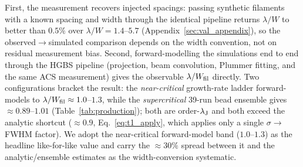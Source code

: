 \documentclass[usenatbib,twoside,twocolumn]{mnras}
\begin{document}
First, the measurement recovers injected spacings: passing synthetic filaments with a known spacing and width through the identical pipeline returns $\lambda/W$ to better than $0.5\%$ over $\lambda/W=1.4$--$5.7$ (Appendix~\ref{sec:val_appendix}), so the observed$\to$simulated comparison depends on the width convention, not on residual measurement bias. Second, forward-modelling the simulations end to end through the HGBS pipeline (projection, beam convolution, Plummer fitting, and the same ACS measurement) gives the observable $\lambda/W_{\rm fil}$ directly. Two configurations bracket the result: the \emph{near-critical} growth-rate ladder forward-models to $\lambda/W_{\rm fil}\approx1.0$--$1.3$, while the \emph{supercritical} 39-run bead ensemble gives $\approx0.89$--$1.01$ (Table~\ref{tab:production}); both are order-$\lambda_{\rm J}$ and both exceed the analytic shortcut ($\approx0.9$, Eq.~\ref{eq:t1_apply}, which applies only a single $\sigma\!\to\!$FWHM factor). We adopt the near-critical forward-model band ($1.0$--$1.3$) as the headline like-for-like value and carry the $\approx30\%$ spread between it and the analytic/ensemble estimates as the width-conversion systematic.
\end{document}
